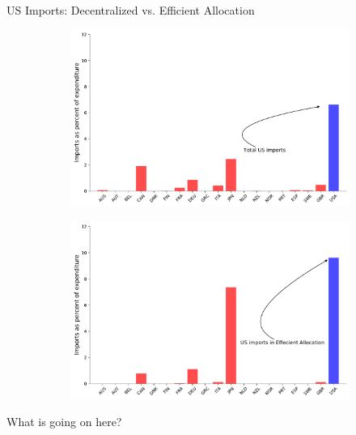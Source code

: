 \documentclass[9pt,pdftex,aspectratio=1610]{beamer}
\theoremstyle{definition}
\begin{document}
\begin{frame}[t]{US Imports: Decentralized vs. Efficient Allocation}

\begin{figure}[!t]
\begin{subfigure}{}
    \includegraphics[scale = 0.26]{../notes/figures/decentralized-trade-us.pdf}
\end{subfigure}
\begin{subfigure}{}
    \includegraphics[scale = 0.26]{../notes/figures/planner-trade-us.pdf}
\end{subfigure}
\end{figure}
\bigskip
What is going on here?
\end{frame}


\end{document}
